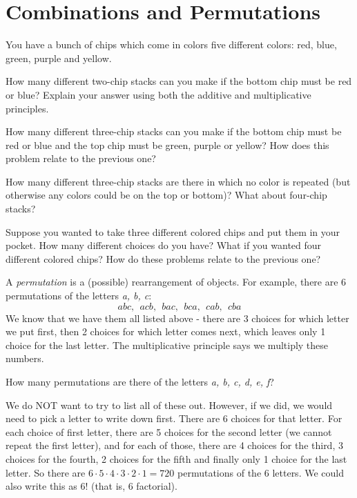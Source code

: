 \documentclass[12pt]{article}
\begin{document}
\section{Combinations and Permutations}

\begin{activity}
You have a bunch of chips which come in colors five different colors: red, blue, green, purple and yellow.
\begin{questions} 

\question How many different two-chip stacks can you make if the bottom chip must be red or blue?  Explain your answer using both the additive and multiplicative principles.

\question How many different three-chip stacks can you make if the bottom chip must be red or blue and the top chip must be green, purple or yellow?  How does this problem relate to the previous one?

\question How many different three-chip stacks are there in which no color is repeated (but otherwise any colors could be on the top or bottom)? What about four-chip stacks?

\question Suppose you wanted to take three different colored chips and put them in your pocket.  How many different choices do you have?  What if you wanted four different colored chips?  How do these problems relate to the previous one?

\end{questions}
\end{activity}

A {\em permutation} is a (possible) rearrangement of objects.  For example, there are 6 permutations of the letters \textit{a, b, c}:
\[abc, ~~ acb, ~~ bac, ~~bca, ~~ cab, ~~ cba\]
We know that we have them all listed above - there are 3 choices for which letter we put first, then 2 choices for which letter comes next, which leaves only 1 choice for the last letter.  The multiplicative principle says we multiply these numbers.

\begin{example}
  How many permutations are there of the letters \textit{a, b, c, d, e, f}?
  \begin{solution}
    We do NOT want to try to list all of these out.  However, if we did, we would need to pick a letter to write down first.  There are 6 choices for that letter.  For each choice of first letter, there are 5 choices for the second letter (we cannot repeat the first letter), and for each of those, there are 4 choices for the third, 3 choices for the fourth, 2 choices for the fifth and finally only 1 choice for the last letter.  So there are $6 \cdot 5 \cdot 4 \cdot 3 \cdot 2 \cdot 1 = 720$ permutations of the 6 letters.  We could also write this as $6!$ (that is, 6 factorial).
  \end{solution}
\end{example}
\end{document}
